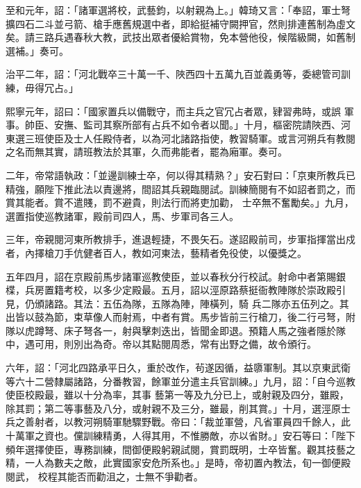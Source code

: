 \begin{pinyinscope}
 至和元年，詔：「諸軍選將校，武藝鈞，以射親為上。」韓琦又言：「奉詔，軍士弩擴四石二斗並弓箭、槍手應舊規選中者，即給挺補守闕押官，然則排連舊制為虛文矣。請三路兵遇春秋大教，武技出眾者優給賞物，免本營他役，候階級闕，如舊制選補。」奏可。



 治平二年，詔：「河北戰卒三十萬一千、陜西四十五萬九百並義勇等，委總管司訓練，毋得冗占。」



 熙寧元年，詔曰：「國家置兵以備戰守，而主兵之官冗占者眾，肄習弗時，或誤
 軍事。帥臣、安撫、監司其察所部有占兵不如令者以聞。」十月，樞密院請陜西、河東選三班使臣及士人任殿侍者，以為河北諸路指使，教習騎軍。或言河朔兵有教閱之名而無其實，請班教法於其軍，久而弗能者，罷為廂軍。奏可。



 二年，帝常語執政：「並邊訓練士卒，何以得其精熟？」安石對曰：「京東所教兵已精強，願陛下推此法以責邊將，間詔其兵親臨閱試。訓練簡閱有不如詔者罰之，而賞其能者。賞不遣賤，罰不避貴，則法行而將吏加勸，
 士卒無不奮勵矣。」九月，選置指使巡教諸軍，殿前司四人，馬、步軍司各三人。



 三年，帝親閱河東所教排手，進退輕捷，不畏矢石。遂詔殿前司，步軍指揮當出戍者，內擇槍刀手伉健者百人，教如河東法，藝精者免役使，以優獎之。



 五年四月，詔在京殿前馬步諸軍巡教使臣，並以春秋分行校試。射命中者第賜銀楪，兵房置籍考校，以多少定殿最。五月，詔以涇原路蔡挺衙教陣隊於崇政殿引見，仍頒諸路。其法：五伍為隊，五隊為陣，陣橫列，騎
 兵二隊亦五伍列之。其出皆以鼓為節，束草像人而射焉，中者有賞。馬步皆前三行槍刀，後二行弓弩，附隊以虎蹲弩、床子弩各一，射與擊刺迭出，皆聞金即退。預籍人馬之強者隱於隊中，遇可用，則別出為奇。帝以其點閱周悉，常有出野之備，故令頒行。



 六年，詔：「河北四路承平日久，重於改作，茍遂因循，益隳軍制。其以京東武衛等六十二營隸屬諸路，分番教習，餘軍並分遣主兵官訓練。」九月，詔：「自今巡教使臣校殿最，雖以十分為率，其事
 藝第一等及九分已上，或射親及四分，雖殿，除其罰；第二等事藝及八分，或射親不及三分，雖最，削其賞。」十月，選涇原士兵之善射者，以教河朔騎軍馳驟野戰。帝曰：「裁並軍營，凡省軍員四千餘人，此十萬軍之資也。儻訓練精勇，人得其用，不惟勝敵，亦以省財。」安石等曰：「陛下頻年選擇使臣，專務訓練，間御便殿躬親試閱，賞罰既明，士卒皆奮。觀其技藝之精，一人為數夫之敵，此實國家安危所系也。」是時，帝初置內教法，旬一御便殿閱武，
 校程其能否而勸沮之，士無不爭勸者。




\end{pinyinscope}
